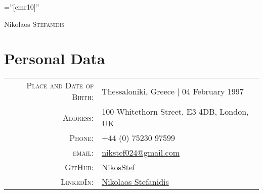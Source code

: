 \documentclass[a4paper,10pt]{article}
\begin{document}
\pagestyle{empty}

\font\fb=''[cmr10]''

\par{\centering
		{\Huge Nikolaos \textsc{Stefanidis}
	}\bigskip\par}

\section{Personal Data}

\begin{tabular}{rl}
    \textsc{Place and Date of Birth:} & Thessaloniki, Greece  | 04 February 1997 \\
    \textsc{Address:}   & 100 Whitethorn Street, E3 4DB, London, UK \\
    \textsc{Phone:}     & +44 (0) 75230 97599 \\
    \textsc{email:}     & \href{mailto:nikstef024@gmail.com}{nikstef024@gmail.com} \\
    \textsc{GitHub:}    & \href{https://github.com/NikosStef}{NikosStef} \\
    \textsc{LinkedIn:}  & \href{https://www.linkedin.com/in/nikolaos-stefanidis-b27aa711a/}{Nikolaos Stefanidis}
\end{tabular}

\end{document}
